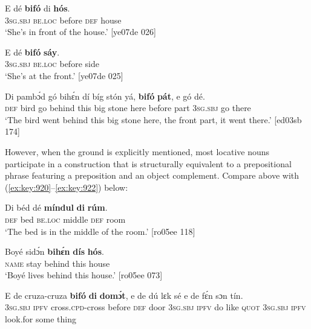 \ea%
    \label{ex:key:917}
    \gll E    dé    \textbf{bifó}    di  \textbf{hós}.\\
\textsc{3sg.sbj}  \textsc{be.loc}  before  \textsc{def}  house\\

\glt ‘She’s in front of the house.’ [ye07de 026]
\z


\ea%
    \label{ex:key:918}
    \gll E    dé    \textbf{bifó}    \textbf{sáy}.\\
\textsc{3sg.sbj}  \textsc{be.loc}  before  side\\

\glt ‘She’s at the front.’ [ye07de 025]
\z


\ea%
    \label{ex:key:919}
    \gll Di  pambɔ́d  gó  bihɛ́n  dí  bíg  stón    yá,    \textbf{bifó}    \textbf{pát},
e    gó  dé.\\
\textsc{def}  bird    go  behind  this  big  stone  here    before  part
\textsc{3sg.sbj}  go  there\\

\glt ‘The bird went behind this big stone here, the front part, it went there.’ [ed03sb 174]
\z

However, when the ground is explicitly mentioned, most locative nouns participate in a construction that is structurally equivalent to a prepositional phrase featuring a preposition and an object complement. Compare  above with (\ref{ex:key:920}–\ref{ex:key:922}) below:


\ea%
    \label{ex:key:920}
    \gll Di  béd  dé    \textbf{míndul}  \textbf{di}  \textbf{rúm}.\\
\textsc{def}  bed  \textsc{be.loc}  middle  \textsc{def}  room\\

\glt ‘The bed is in the middle of the room.’ [ro05ee 118]
\z


\ea%
    \label{ex:key:921}
    \gll Boyé  sidɔ́n  \textbf{bihɛ́n}  \textbf{dís}  \textbf{hós}.\\
\textsc{name}  stay    behind  this  house\\

\glt ‘Boyé lives behind this house.’ [ro05ee 073]
\z


\ea%
    \label{ex:key:922}
    \gll E    de  cruza-cruza    \textbf{bifó}    \textbf{di}  \textbf{domɔ́t},  e    de  dú
lɛk  sé    e    de  fɛ́n    sɔn    tín.\\
\textsc{3sg.sbj}  \textsc{ipfv}  cross.\textsc{cpd}{}-cross  before  \textsc{def}  door  \textsc{3sg.sbj}  \textsc{ipfv}  do
like  \textsc{quot}    \textsc{3sg.sbj}  \textsc{ipfv}  look.for  some  thing\\

